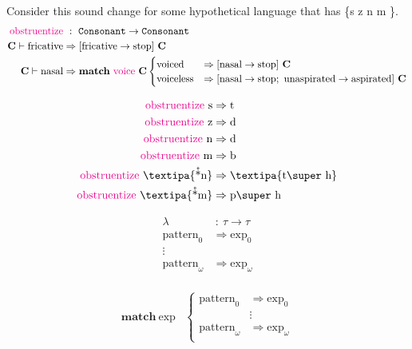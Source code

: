 \documentclass{report}[12pt]
\begin{document}
Consider this sound change for some hypothetical language that has \{s z n m  \}.
\begin{align*}
  \text{\textcolor{magenta}{obstruentize}} &\ :\ \texttt{Consonant} \rightarrow \texttt{Consonant} \\
  \textbf{C} \vdash \text{fricative} & \Rightarrow [\text{fricative} \rightarrow \text{stop}]\ \textbf{C} \\
  \textbf{C} \vdash \text{nasal} & \Rightarrow \textbf{match}\ \text{\textcolor{magenta}{voice}}\ \textbf{C}
                                   \begin{cases}
                                     \text{voiced} & \Rightarrow [\text{nasal} \rightarrow \text{stop}]\ \textbf{C} \\
                                     \text{voiceless} & \Rightarrow [\text{nasal} \rightarrow \text{stop};\ \text{unaspirated} \rightarrow \text{aspirated}]\ \textbf{C} \\
                                   \end{cases}
\end{align*}

\begin{align*}
  \text{\textcolor{magenta}{obstruentize}}\ \text{s} & \Rightarrow \text{t} \\
  \text{\textcolor{magenta}{obstruentize}}\ \text{z} & \Rightarrow \text{d} \\
  \text{\textcolor{magenta}{obstruentize}}\ \text{n} & \Rightarrow \text{d} \\
  \text{\textcolor{magenta}{obstruentize}}\ \text{m} & \Rightarrow \text{b} \\
  \text{\textcolor{magenta}{obstruentize}}\ \text{\textipa{\r*n}} & \Rightarrow \text{\textipa{t\super h}} \\
  \text{\textcolor{magenta}{obstruentize}}\ \text{\textipa{\r*m}} & \Rightarrow \text{p\super h} \\
\end{align*}

\begin{align*}
  \lambda &\ :\ \tau \rightarrow \tau \\
  \text{pattern}_0 & \Rightarrow \text{exp}_0 \\
  \vdots & \\
  \text{pattern}_\omega & \Rightarrow \text{exp}_\omega \\
\end{align*}

\begin{align*}
  \textbf{match}\ \text{exp} & \begin{cases}
                                 \text{pattern}_0 & \Rightarrow \text{exp}_0 \\
                                                  & \vdots \\
                                 \text{pattern}_\omega & \Rightarrow \text{exp}_\omega \\
                               \end{cases}\\
\end{align*}
\end{document}
